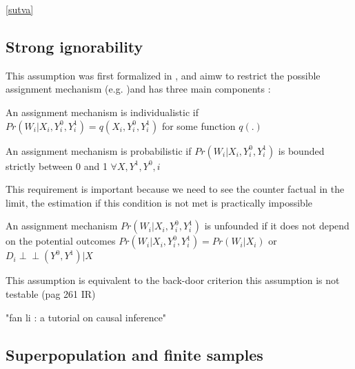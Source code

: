 \ref{sutva}

\subsection{Strong ignorability}
This assumption was first formalized in \citep{rosenbaum1983central} , and aimw to restrict the possible assignment mechanism (e.g. )and has three main components :

\begin{ass}
An assignment mechanism is individualistic if $Pr(W_i| X_i , Y_i^0 ,Y_i^1) = q( X_i , Y_i^0 ,Y_i^1)$ for some function $q(.)$
\end{ass}

\begin{ass}
An assignment mechanism is probabilistic if $Pr(W_i| X_i , Y_i^0 ,Y_i^1)$ is bounded strictly between 0 and 1 $\forall X,Y^1,Y^0,i$
\end{ass}
This requirement is important because we need to see the counter factual in the limit, the estimation if this condition is not met is practically impossible 


\begin{ass}
An assignment mechanism $Pr(W_i| X_i , Y_i^0 ,Y_i^1)$ is unfounded if  it does not depend on the potential outcomes $Pr(W_i| X_i , Y_i^0 ,Y_i^1)=Pr(W_i| X_i )$ or $D_i  \perp\!\!\!\perp (Y^{0},Y^{1}) | X$
\end{ass}
This assumption is equivalent to   the back-door criterion 
this assumption is not testable (pag 261 IR)





"fan li : a tutorial on causal inference"

\subsection{Superpopulation and finite samples}



